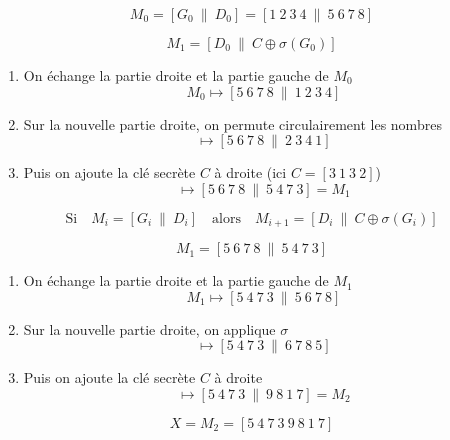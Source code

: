 \begin{frame}


$$M_0 = [ G_0 \ \|\  D_0] = [1\  2\  3\  4\  \| \ 5\  6\  7\  8]$$
\pause

$$M_1 = [ D_0 \ \|\  C \oplus \sigma(G_0)]$$
\pause

\begin{enumerate}
  \item On échange la partie droite et la partie gauche de $M_0$ 
\pause  
$$M_0  \longmapsto  [5\  6\  7\  8\  \|\  1\  2\  3\  4]$$
\pause
  \item Sur la nouvelle partie droite, on permute circulairement les nombres
\pause  
$$\longmapsto  [5\  6\  7\  8\  \|\ 2\  3\  4\  1]$$
\pause

  \item Puis on ajoute la clé secrète $C$ à droite (ici $C=[3\  1\  3\  2]$)
\pause  
$$\longmapsto  [5\  6\  7\  8\  \| \ 5\  4\  7\  3] = M_1$$
\end{enumerate}

\end{frame}


\begin{frame}


$$\text{Si} \quad M_i=[G_i \ \| \ D_i] \quad \text{alors} \quad M_{i+1} = [ D_i \ \| \ C \oplus \sigma(G_i)]$$

\pause

$$M_1 = [5\  6\  7\  8\  \|\ 5\  4\  7\  3]$$
\pause
\begin{enumerate}
  \item On échange la partie droite et la partie gauche de $M_1$
$$M_1  \longmapsto  [5\  4\  7\  3\  \| \ 5\  6\  7\  8]$$
\pause
  \item Sur la nouvelle partie droite, on applique $\sigma$
$$\longmapsto  [5\  4\  7\  3\  \| \ 6\  7\  8\  5]$$
\pause
  \item Puis on ajoute la clé secrète $C$ à droite
$$\longmapsto  [5\  4\  7\  3\  \| \ 9\  8\  1\  7] = M_2$$
\end{enumerate}
\pause
$$X=M_2 = [5\  4\  7\  3\ 9\  8\  1\  7]$$

\end{frame}



